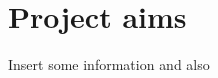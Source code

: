 \documentclass[../main.tex]{subfiles}
\begin{document}
\chapter{Project aims}
\label{cha:projectaims}

Insert some information \cite{basselMulticellularSystemsBiology2019} and also \cite{hughesNonDestructiveHighContentAnalysis2017}
\end{document}
